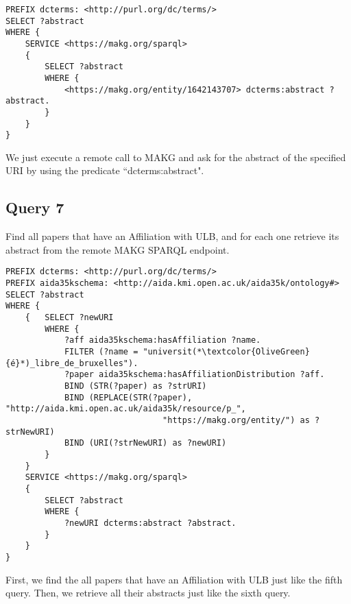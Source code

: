 \documentclass{article}[a4]
\begin{document}
\begin{lstlisting}[language=SPARQL]
PREFIX dcterms: <http://purl.org/dc/terms/>
SELECT ?abstract
WHERE {
    SERVICE <https://makg.org/sparql>
    {
        SELECT ?abstract
        WHERE {
            <https://makg.org/entity/1642143707> dcterms:abstract ?abstract.
        }
    }
}
\end{lstlisting}

We just execute a remote call to MAKG and ask for the abstract of the specified URI by using the predicate ``dcterms:abstract".


\subsection{Query 7}
Find all papers that have an Affiliation with ULB, and for each one retrieve its abstract from the remote MAKG SPARQL endpoint.

\begin{lstlisting}[language=SPARQL]
PREFIX dcterms: <http://purl.org/dc/terms/>
PREFIX aida35kschema: <http://aida.kmi.open.ac.uk/aida35k/ontology#>
SELECT ?abstract
WHERE {
    { 	SELECT ?newURI
        WHERE {
            ?aff aida35kschema:hasAffiliation ?name.
            FILTER (?name = "universit(*\textcolor{OliveGreen}{é}*)_libre_de_bruxelles").
            ?paper aida35kschema:hasAffiliationDistribution ?aff.
            BIND (STR(?paper) as ?strURI)
            BIND (REPLACE(STR(?paper), "http://aida.kmi.open.ac.uk/aida35k/resource/p_",
                                "https://makg.org/entity/") as ?strNewURI)
            BIND (URI(?strNewURI) as ?newURI)
        }
    }
    SERVICE <https://makg.org/sparql>
    {
        SELECT ?abstract
        WHERE {
            ?newURI dcterms:abstract ?abstract.
        }
    }
}
\end{lstlisting}

First, we find the all papers that have an Affiliation with ULB just like the fifth query. Then, we retrieve all their abstracts just like the sixth query.
\end{document}
